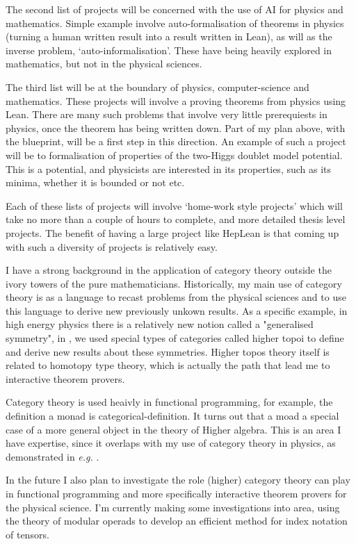 \documentclass[14pt,letter]{article}
\newcounter{customtitle}
\begin{document}
The second list of projects  will be concerned with the use of AI for physics and mathematics. Simple example involve auto-formalisation of theorems in physics (turning a human written result into a result written in Lean), as will as the inverse problem, `auto-informalisation'. These have being heavily explored in mathematics, but not in the physical sciences. 

The third list will be at the boundary of physics, computer-science and mathematics. These projects will involve a proving theorems from physics using Lean. There are many such problems that involve very little prerequiests in physics, once the theorem has being written down. Part of my plan above, with the blueprint, will be a first step in this direction. An example of such a project will be to formalisation of properties of the two-Higgs doublet model potential. 
This is a potential, and physicists are interested in its properties, 
such as its minima, whether it is bounded or not etc.

Each of these lists of projects will involve `home-work style projects' which will take no more than a couple of hours to complete, and more detailed thesis level projects. The benefit of having a large project like HepLean is that coming up with such a diversity of projects is relatively easy. 

 I have a strong background in the application of category theory 
outside the ivory towers of the pure mathematicians. Historically, my main use of category theory 
is as a language to recast problems from the physical sciences and to use this language 
to derive new previously unkown results. As a specific example, in high energy physics 
there is a relatively new notion called a "generalised symmetry", in  , 
we used special types of categories called higher topoi to define and derive new results 
about these symmetries. Higher topos theory itself is related to homotopy type theory, which is actually 
the path that lead me to interactive theorem provers. 

Category theory is used heaivly in functional programming, for example, the definition a monad is categorical-definition. It turns out that a moad 
a special case of a more general object in the theory of Higher algebra. 
This is an area I have expertise, since it overlaps with my use of category theory in physics, as demonstrated in \emph{e.g.} \js{}. 

In the future I also plan to investigate the role (higher) category theory can play in functional programming and more specifically interactive theorem provers for the physical science. I'm currently making some investigations into area, using the theory of modular operads to develop an efficient method for index notation of tensors. 
\end{document}
